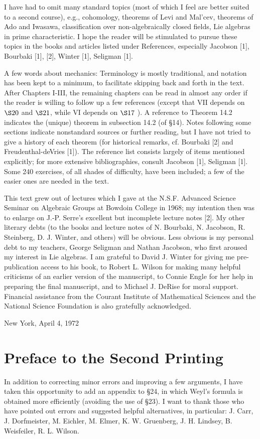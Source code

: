 \documentclass[10pt]{article}
\begin{document}
I have had to omit many standard topics (most of which I feel are better suited to a second course), e.g., cohomology, theorems of Levi and Mal'cev, theorems of Ado and Iwasawa, classification over non-algebraically closed fields, Lie algebras in prime characteristic. I hope the reader will be stimulated to pursue these topics in the books and articles listed under References, especially Jacobson [1], Bourbaki [1], [2], Winter [1], Seligman [1].

A few words about mechanics: Terminology is mostly traditional, and notation has been kept to a minimum, to facilitate skipping back and forth in the text. After Chapters I-III, the remaining chapters can be read in almost any order if the reader is willing to follow up a few references (except that VII depends on $\S 20$ and $\S 21$, while VI depends on $\S 17$ ). A reference to Theorem 14.2 indicates the (unique) theorem in subsection 14.2 (of §14). Notes following some sections indicate nonstandard sources or further reading, but I have not tried to give a history of each theorem (for historical remarks, cf. Bourbaki [2] and Freudenthal-deVries [1]). The reference list consists largely of items mentioned explicitly; for more extensive bibliographies, consult Jacobson [1], Seligman [1]. Some 240 exercises, of all shades of difficulty, have been included; a few of the easier ones are needed in the text.

This text grew out of lectures which I gave at the N.S.F. Advanced Science Seminar on Algebraic Groups at Bowdoin College in 1968; my intention then was to enlarge on J.-P. Serre's excellent but incomplete lecture notes [2]. My other literary debts (to the books and lecture notes of N. Bourbaki, N. Jacobson, R. Steinberg, D. J. Winter, and others) will be obvious. Less obvious is my personal debt to my teachers, George Seligman and Nathan Jacobson, who first aroused my interest in Lie algebras. I am grateful to David J. Winter for giving me pre-publication access to his book, to Robert L. Wilson for making many helpful criticisms of an earlier version of the manuscript, to Connie Engle for her help in preparing the final manuscript, and to Michael J. DeRise for moral support. Financial assistance from the Courant Institute of Mathematical Sciences and the National Science Foundation is also gratefully acknowledged.

New York, April 4, 1972



\section*{Preface to the Second Printing}
In addition to correcting minor errors and improving a few arguments, I have taken this opportunity to add an appendix to §24, in which Weyl's formula is obtained more efficiently (avoiding the use of §23). I want to thank those who have pointed out errors and suggested helpful alternatives, in particular: J. Carr, J. Dorfmeister, M. Eichler, M. Elmer, K. W. Gruenberg, J. H. Lindsey, B. Weisfeiler, R. L. Wilson.
\end{document}
